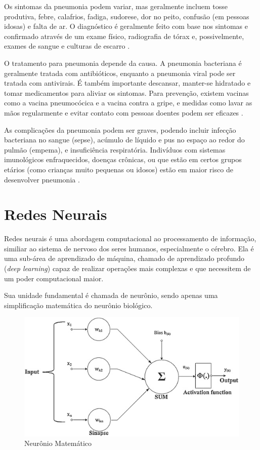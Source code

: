 Os sintomas da pneumonia podem variar, mas geralmente incluem tosse produtiva, febre, calafrios, fadiga, sudorese, dor no peito, confusão (em pessoas idosas) e falta de ar. O diagnóstico é geralmente feito com base nos sintomas e confirmado através de um exame físico, radiografia de tórax e, possivelmente, exames de sangue e culturas de escarro \cite{WHO2023Pneumonia}.

O tratamento para pneumonia depende da causa. A pneumonia bacteriana é geralmente tratada com antibióticos, enquanto a pneumonia viral pode ser tratada com antivirais. É também importante descansar, manter-se hidratado e tomar medicamentos para aliviar os sintomas. Para prevenção, existem vacinas como a vacina pneumocócica e a vacina contra a gripe, e medidas como lavar as mãos regularmente e evitar contato com pessoas doentes podem ser eficazes \cite{WHO2023Pneumonia}.

As complicações da pneumonia podem ser graves, podendo incluir infecção bacteriana no sangue (sepse), acúmulo de líquido e pus no espaço ao redor do pulmão (empema), e insuficiência respiratória. Indivíduos com sistemas imunológicos enfraquecidos, doenças crônicas, ou que estão em certos grupos etários (como crianças muito pequenas ou idosos) estão em maior risco de desenvolver pneumonia \cite{pneumoniaSymptoms}.  



\section{Redes Neurais}

Redes neurais é uma abordagem computacional ao processamento de informação, similiar ao sistema de nervoso dos seres humanos, especialmente o cérebro. Ela é uma sub-área de aprendizado de máquina, chamado de aprendizado profundo (\textit{deep learning}) capaz de realizar operações mais complexas e que necessitem de um poder computacional maior.

Sua unidade fundamental é chamada de neurônio, sendo apenas uma simplificação matemática do neurônio biológico. 

\begin{figure}[!ht]
    \begin{center}
    \includegraphics[width=350pt]{pictures/neuronio-matematico.png}
    \caption{Neurônio Matemático}
    \label{pic:neuronio}
    \end{center}
\end{figure}


